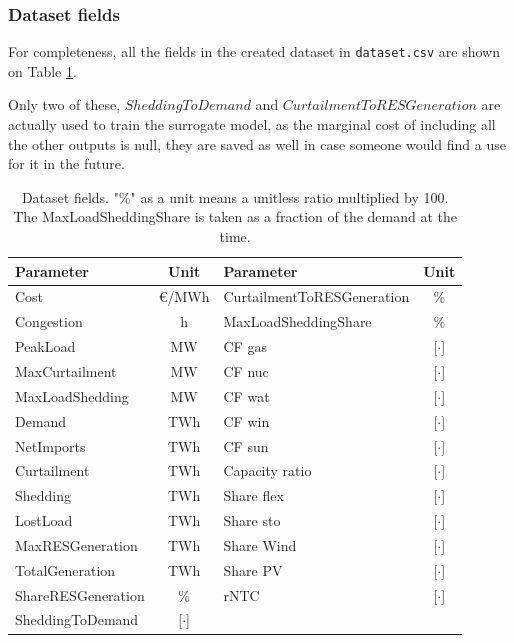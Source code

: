 \subsubsection{Dataset fields}

For completeness, all the fields in the created dataset in \texttt{dataset.csv} are shown on Table \ref{table:dataset-fields}.

Only two of these, $SheddingToDemand$ and $CurtailmentToRESGeneration$ are actually used to train the surrogate model, as the marginal cost of including all the other outputs is null, they are saved as well in case someone would find a use for it in the future.

\begin{table}[h]
    \centering
	\begin{tabular}{|l c|l c|}
		\hline
		Parameter & Unit & Parameter & Unit \\
		\hline
		Cost             & €/MWh & CurtailmentToRESGeneration & \% \\
		Congestion       & h     & MaxLoadSheddingShare & \% \\
		PeakLoad         & MW    & CF gas         & [$\cdot$] \\
		MaxCurtailment   & MW    & CF nuc         & [$\cdot$] \\
		MaxLoadShedding  & MW    & CF wat         & [$\cdot$] \\
		Demand           & TWh   & CF win         & [$\cdot$] \\
		NetImports       & TWh   & CF sun         & [$\cdot$] \\
		Curtailment      & TWh   & Capacity ratio & [$\cdot$] \\
		Shedding         & TWh   & Share flex     & [$\cdot$] \\
		LostLoad         & TWh   & Share sto      & [$\cdot$] \\
        MaxRESGeneration & TWh   & Share Wind     & [$\cdot$] \\
        TotalGeneration  & TWh   & Share PV       & [$\cdot$] \\
        ShareRESGeneration & \%  & rNTC           & [$\cdot$] \\
        SheddingToDemand & [$\cdot$] & & \\
		\hline
	\end{tabular}
	\caption{Dataset fields. "\%" as a unit means a unitless ratio multiplied by 100. The MaxLoadSheddingShare is taken as a fraction of the demand at the time.}
	\label{table:dataset-fields} 
\end{table}
